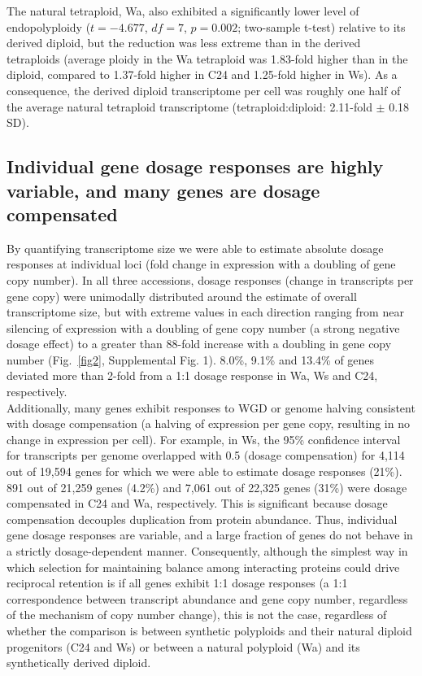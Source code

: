\documentclass[11pt]{article}
\begin{document}
The natural tetraploid, Wa, also exhibited a significantly lower level of endopolyploidy ($t = -4.677$, $df = 7$, $p = 0.002$; two-sample t-test) relative to its derived diploid, but the reduction was less extreme than in the derived tetraploids (average ploidy in the Wa tetraploid was 1.83-fold higher than in the diploid, compared to 1.37-fold higher in C24 and 1.25-fold higher in Ws).
As a consequence, the derived diploid transcriptome per cell was roughly one half of the average natural tetraploid transcriptome (tetraploid:diploid: 2.11-fold $\pm$ 0.18 SD).

\subsection*{Individual gene dosage responses are highly variable, and many genes are dosage compensated}

By quantifying transcriptome size we were able to estimate absolute dosage responses at individual loci (fold change in expression with a doubling of gene copy number). In all three accessions, dosage responses (change in transcripts per gene copy) were unimodally distributed around the estimate of overall transcriptome size, but with extreme values in each direction ranging from near silencing of expression with a doubling of gene copy number (a strong negative dosage effect) to a greater than 88-fold increase with a doubling in gene copy number (Fig.~\ref{fig2}, Supplemental Fig. 1). 8.0\%, 9.1\% and 13.4\% of genes deviated more than 2-fold from a 1:1 dosage response in Wa, Ws and C24, respectively.\\

Additionally, many genes exhibit responses to WGD or genome halving consistent with dosage compensation (a halving of expression per gene copy, resulting in no change in expression per cell). For example, in Ws, the 95\% confidence interval for transcripts per genome overlapped with 0.5 (dosage compensation) for 4,114 out of 19,594 genes for which we were able to estimate dosage responses (21\%). 891 out of 21,259 genes (4.2\%) and 7,061 out of 22,325 genes (31\%) were dosage compensated in C24 and Wa, respectively. This is significant because dosage compensation decouples duplication from protein abundance. Thus, individual gene dosage responses are variable, and a large fraction of genes do not behave in a strictly dosage-dependent manner. Consequently, although the simplest way in which selection for maintaining balance among interacting proteins could drive reciprocal retention is if all genes exhibit 1:1 dosage responses (a 1:1 correspondence between transcript abundance and gene copy number, regardless of the mechanism of copy number change), this is not the case, regardless of whether the comparison is between synthetic polyploids and their natural diploid progenitors (C24 and Ws) or between a natural polyploid (Wa) and its synthetically derived diploid.
\end{document}
